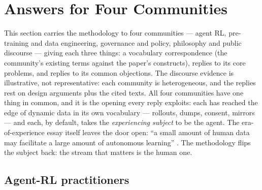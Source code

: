 \documentclass[10pt]{article}
\begin{document}
\section{Answers for Four Communities}

This section carries the methodology to four communities --- agent RL, pre-training and data engineering, governance and policy, philosophy and public discourse --- giving each three things: a vocabulary correspondence (the community's existing terms against the paper's constructs), replies to its core problems, and replies to its common objections. The discourse evidence is illustrative, not representative: each community is heterogeneous, and the replies rest on design arguments plus the cited texts. All four communities have one thing in common, and it is the opening every reply exploits: each has reached the edge of dynamic data in its own vocabulary --- rollouts, dumps, consent, mirrors --- and each, by default, takes the \emph{experiencing subject} to be the agent. The era-of-experience essay itself leaves the door open: ``a small amount of human data may facilitate a large amount of autonomous learning'' \cite{ref3}. The methodology flips the subject back: the stream that matters is the human one.

\subsection{Agent-RL practitioners}
\end{document}
